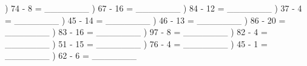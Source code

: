 \documentclass{article}%
\begin{document}
\newline%
) 74 {-} 8 = \_\_\_\_\_\_\_%
\newline%
\newline%
) 67 {-} 16 = \_\_\_\_\_\_\_%
\newline%
\newline%
) 84 {-} 12 = \_\_\_\_\_\_\_%
\newline%
\newline%
) 37 {-} 4 = \_\_\_\_\_\_\_%
\newline%
\newline%
) 45 {-} 14 = \_\_\_\_\_\_\_%
\newline%
\newline%
) 46 {-} 13 = \_\_\_\_\_\_\_%
\newline%
\newline%
) 86 {-} 20 = \_\_\_\_\_\_\_%
\newline%
\newline%
) 83 {-} 16 = \_\_\_\_\_\_\_%
\newline%
\newline%
) 97 {-} 8 = \_\_\_\_\_\_\_%
\newline%
\newline%
) 82 {-} 4 = \_\_\_\_\_\_\_%
\newline%
\newline%
) 51 {-} 15 = \_\_\_\_\_\_\_%
\newline%
\newline%
) 76 {-} 4 = \_\_\_\_\_\_\_%
\newline%
\newline%
) 45 {-} 1 = \_\_\_\_\_\_\_%
\newline%
\newline%
) 62 {-} 6 = \_\_\_\_\_\_\_%
\newline%
\newline%
\newline%
\end{document}
